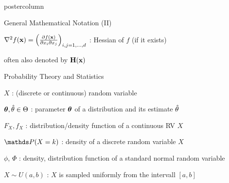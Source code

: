 \documentclass[11pt,compress,t,notes=noshow, xcolor=table]{beamer}
\begin{document}
\begin{frame}[fragile]{}
\begin{columns}
\begin{column}{.31\textwidth}
\begin{beamercolorbox}[center]{postercolumn}
\begin{minipage}{.98\textwidth}
{\begin{myblock}{General Mathematical Notation (II)}
						\begin{codebox}
							 $\nabla^2 f(\mathbf{x}) = \left(\frac{\partial f(\mathbf{x})}{\partial x_i \partial x_j}\right)_{i, j=1, ..., d}$ : Hessian of $f$ (if it exists)
						\end{codebox}
						\hspace*{1ex} often also denoted by $\mathbf{H}(\mathbf{x})$ \\
					\end{myblock}
						\vspace*{-2cm}
						\begin{myblock}{Probability Theory and Statistics}
						\begin{codebox}
							 $X$ : (discrete or continuous) random variable
						\end{codebox}
 						\hspace*{1ex} %
 						\hspace*{1ex}
						\begin{codebox}
							 $\bm{\theta}, \hat{\theta} \in \Theta$ : parameter $\bm{\theta}$ of a distribution and its estimate $\hat{\theta}$
						\end{codebox}
 						\hspace*{1ex}
						\begin{codebox}
							 $F_X, f_X$ : distribution/density function of a continuous RV $X$
						\end{codebox}
 						\hspace*{1ex} %
						\begin{codebox}
							 $\P(X = k)$ : density of a discrete random variable $X$
						\end{codebox}
 						\hspace*{1ex} %
						\begin{codebox}
							 $\phi$, $\Phi$ : density, distribution function of a standard normal random variable
						\end{codebox}
						\hspace*{1ex} %
						\begin{codebox}
							 $X \sim U(a, b)$ : $X$ is sampled uniformly from the intervall $[a, b]$
						\end{codebox}
						\hspace*{1ex}

\end{myblock}}
\end{minipage}
\end{beamercolorbox}
\end{column}
\end{columns}
\end{frame}
\end{document}
